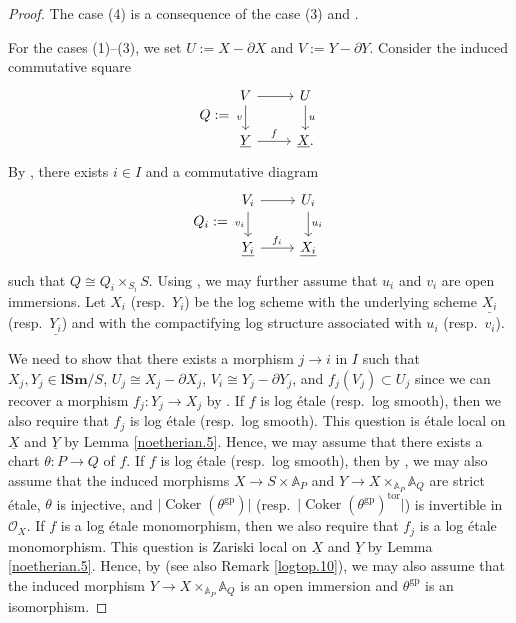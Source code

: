 \documentclass[11pt, a4paper]{amsart}
\theoremstyle{definition}
\numberwithin{equation}{subsection}
\newcommand{\A}{\mathbb{A}}
\newcommand{\lSm}{\mathbf{lSm}}
\newcommand{\coker}{\operatorname{Coker}}			 %
\renewcommand{\ul}{\underline}
\newcommand{\gp}{{\mathrm{gp}}}
\newcommand{\cO}{\mathcal{O}}
\begin{document}
\begin{proof}
The case (4) is a consequence of the case (3) and \cite[Th\'eor\`eme IV.8.10.5,(vi),(xii)]{EGA}.

For the cases (1)--(3),
we set $U:=X-\partial X$ and $V:=Y-\partial Y$.
Consider the induced commutative square
\[
Q:=
\begin{tikzcd}
V\ar[d,"v"']\ar[r]&
U\ar[d,"u"]
\\
\ul{Y}\ar[r,"f"]&
\ul{X}.
\end{tikzcd}
\]
By \cite[Th\'eor\`eme IV.8.8.2]{EGA},
there exists $i\in I$ and a commutative diagram
\[
Q_i:=
\begin{tikzcd}
V_i\ar[d,"v_i"']\ar[r]&
U_i\ar[d,"u_i"]
\\
\ul{Y_i}\ar[r,"f_i"]&
\ul{X_i}
\end{tikzcd}
\]
such that $Q\cong Q_i\times_{S_i}S$.
Using \cite[Th\'eor\`eme IV.8.10.5(iii)]{EGA},
we may further assume that $u_i$ and $v_i$ are open immersions.
Let $X_i$ (resp.\ $Y_i$) be the log scheme with the underlying scheme $\ul{X_i}$ (resp.\ $\ul{Y_i}$) and with the compactifying log structure associated with $u_i$ (resp.\ $v_i$).

We need to show that there exists a morphism $j\to i$ in $I$ such that $X_j,Y_j\in \lSm/S$, $U_j\cong X_j-\partial X_j$, $V_i\cong Y_j-\partial Y_j$, and $f_j(V_j)\subset U_j$ since we can recover a morphism $f_j\colon Y_j\to X_j$ by \cite[Proposition III.1.6.2]{Ogu}.
If $f$ is log \'etale (resp.\ log smooth),
then we also require that $f_j$ is log \'etale (resp.\ log smooth).
This question is \'etale local on $\ul{X}$ and $\ul{Y}$ by Lemma \ref{noetherian.5}.
Hence, we may assume that there exists a chart $\theta\colon P\to Q$ of $f$.
If $f$ is log \'etale (resp.\ log smooth),
then by \cite[Theorem IV.3.3.1]{Ogu},
we may also assume that the induced morphisms $X\to S\times \A_P$ and $Y\to X\times_{\A_P}\A_Q$ are strict \'etale, $\theta$ is injective,
and $\lvert \coker(\theta^\gp)\rvert$ (resp.\ $\lvert \coker(\theta^\gp)^\mathrm{tor}\rvert$) is invertible in $\cO_X$.
If $f$ is a log \'etale monomorphism,
then we also require that $f_j$ is a log \'etale monomorphism.
This question is Zariski local on $\ul{X}$ and $\ul{Y}$ by Lemma \ref{noetherian.5}.
Hence, by \cite[Lemma A.11.3]{logDM} (see also Remark \ref{logtop.10}),
we may also assume that the induced morphism $Y\to X\times_{\A_P}\A_Q$ is an open immersion and $\theta^\gp$ is an isomorphism.


\end{proof}
\end{document}
